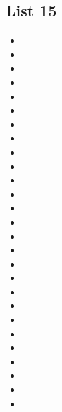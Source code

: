 \documentclass[a4paper,10pt]{article}
\begin{document}
\begin{CJK*}{UTF8}{gkai}
\section{List 15}
\begin{itemize}
\item 
\hspace{1cm}
\item 
\hspace{1cm}
\item 
\hspace{1cm}
\item 
\hspace{1cm}
\item 
\item 
\item 
\item 
\item 
\item 
\item 
\item 
\item 
\item 
\item 
\item 
\item 
\item 
\item 
\item 
\item 
\item 
\item 
\item 
\item 
\item 
\item 
\end{itemize}

\newpage

\end{CJK*}
\end{document}
